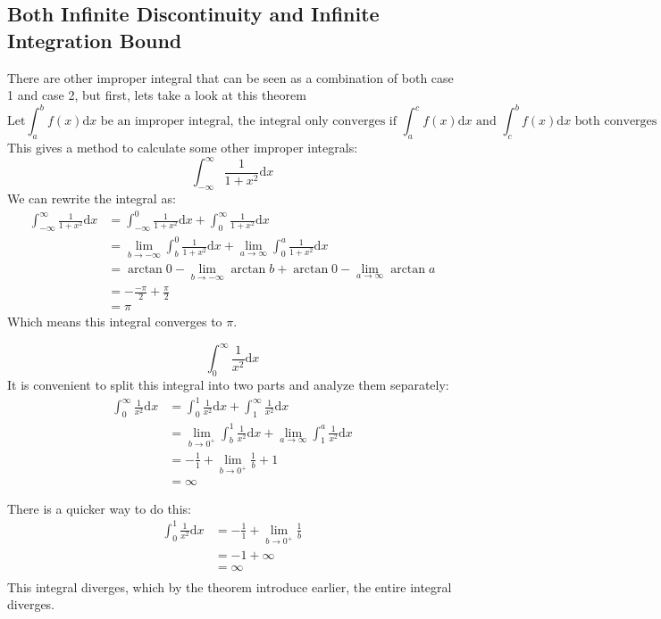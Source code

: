 \documentclass{article}
\begin{document}
\subsection{Both Infinite Discontinuity and Infinite Integration Bound}
There are other improper integral that can be seen as a combination of both case 1 and case 2,
but first, lets take a look at this theorem
\[
    \text{Let} \int_{a}^{b} f(x)\mathrm{d}x \text{ be an improper integral, } 
    \text{the integral only converges if } \int_{a}^{c} f(x)\mathrm{d}x \text{ and } \int_{c}^{b} f(x)\mathrm{d}x \text{ both converges}
\]
This gives a method to calculate some other improper integrals:
\[
    \int_{-\infty}^{\infty} \frac{1}{1+x^2}\mathrm{d}x
\]
We can rewrite the integral as:
\[
    \begin{split}
        \int_{-\infty}^{\infty} \frac{1}{1+x^2}\mathrm{d}x & = \int_{-\infty}^{0} \frac{1}{1+x^2}\mathrm{d}x + \int_{0}^{\infty} \frac{1}{1+x^2} \mathrm{d}x \\
        & = \lim_{b\to -\infty} \int_{b}^{0} \frac{1}{1+x^2}\mathrm{d}x + \lim_{a\to \infty} \int_{0}^{a}\frac{1}{1+x^2}\mathrm{d}x\\
        & = \arctan 0 - \lim_{b\to -\infty} \arctan b + \arctan 0 - \lim_{a\to \infty} \arctan a \\
        & = -\frac{-\pi}{2} + \frac{\pi}{2} \\
        & = \pi
    \end{split}
\]
Which means this integral converges to $\pi$.

\[
    \int_{0}^{\infty} \frac{1}{x^2}\mathrm{d}x
\]
It is convenient to split this integral into two parts and analyze them separately:
\[
    \begin{split}
        \int_{0}^{\infty} \frac{1}{x^2}\mathrm{d}x &= \int_{0}^{1}\frac{1}{x^2}\mathrm{d}x + \int_{1}^{\infty}\frac{1}{x^2} \mathrm{d}x\\
        & = \lim_{b\to 0^+} \int_{b}^{1} \frac{1}{x^2}\mathrm{d}x + \lim_{a\to \infty} \int_{1}^{a} \frac{1}{x^2} \mathrm{d}x \\
        & = -\frac{1}{1} + \lim_{b\to 0^+} \frac{1}{b} + 1\\
        & = \infty
    \end{split}
\]

There is a quicker way to do this:
\[
    \begin{split}
        \int_{0}^{1}\frac{1}{x^2}\mathrm{d}x & = -\frac{1}{1} + \lim_{b\to 0^+} \frac{1}{b} \\
        & = -1 + \infty \\
        & = \infty \\
    \end{split}
\]
This integral diverges, which by the theorem introduce earlier, the entire integral diverges.
\end{document}

